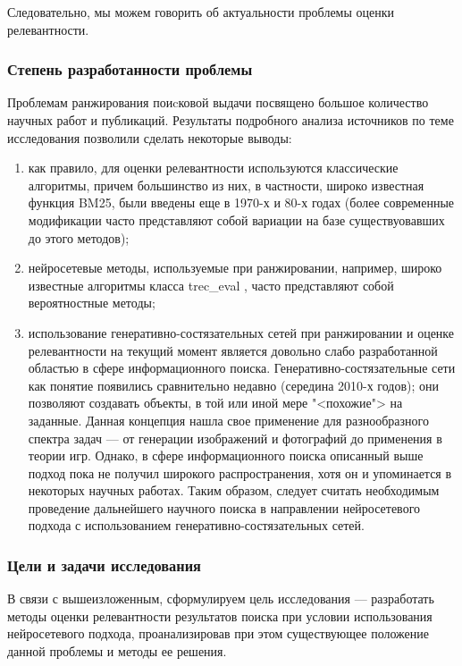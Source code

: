 Следовательно, мы можем говорить об актуальности проблемы оценки релевантности.

\subsubsection{Степень разработанности проблемы}
Проблемам ранжирования поиcковой выдачи посвящено большое количество научных работ и публикаций. Результаты подробного анализа
источников по теме исследования позволили сделать некоторые выводы:
\begin{enumerate}[1)]
    \item как правило, для оценки релевантности используются классические алгоритмы, причем большинство из них, в частности,
          широко известная функция BM25, были введены еще в 1970-х и 80-х годах (более современные модификации часто представляют
          собой вариации на базе существуовавших до этого методов);
    \item нейросетевые методы, используемые при ранжировании, например, широко известные алгоритмы класса trec\_eval
          \cite{10.1145/344250.344252}, часто представляют собой вероятностные методы;
    \item использование генеративно-состязательных сетей при ранжировании и оценке релевантности на текущий момент
          является довольно слабо разработанной областью в сфере информационного поиска. Генеративно-состязательные сети как понятие появились
          сравнительно недавно (середина 2010-х годов); они позволяют создавать объекты, в той или иной мере "<похожие"> на заданные.
          Данная концепция нашла свое применение для разнообразного спектра задач --- от генерации изображений и фотографий до
          применения в теории игр. Однако, в сфере информационного поиска описанный выше подход пока не получил широкого распространения,
          хотя он и упоминается в некоторых научных работах. Таким образом, следует считать необходимым проведение
          дальнейшего научного поиска в направлении нейросетевого подхода с использованием генеративно-состязательных сетей.
\end{enumerate}

\subsubsection{Цели и задачи исследования}


В связи с вышеизложенным, сформулируем цель исследования --- разработать методы оценки релевантности результатов поиска при
условии использования нейросетевого подхода, проанализировав при этом существующее положение данной проблемы и методы ее решения.

